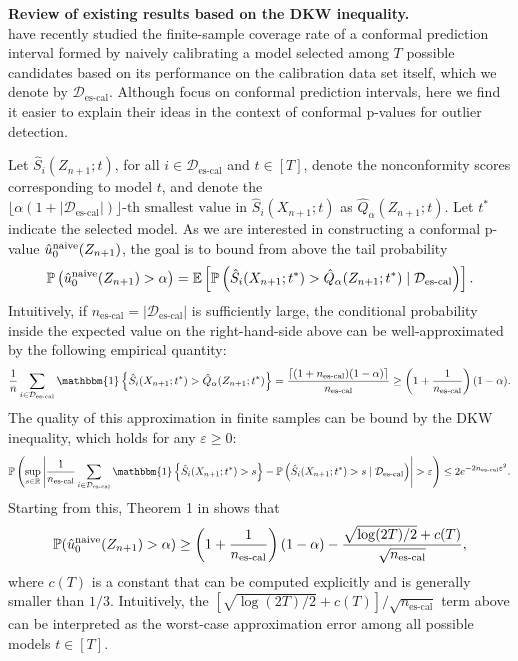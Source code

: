 \noindent \textbf{Review of existing results based on the DKW inequality.}\\
\citet{efficiency_first_cp} have recently studied the finite-sample coverage rate of a conformal prediction interval formed by naively calibrating a model selected among $T$ possible candidates based on its performance on the calibration data set itself, which we denote by $\mathcal{D}_{\text{es-cal}}$.
Although \citet{efficiency_first_cp} focus on conformal prediction intervals, here we find it easier to explain their ideas in the context of conformal p-values for outlier detection.

Let $\hat{S}_i(Z_{n+1};t)$, for all $i \in \mathcal{D}_{\text{es-cal}}$ and $t \in [T]$, denote the nonconformity scores corresponding to model $t$, and denote the  $\lfloor \alpha(1+|\mathcal{D}_{\text{es-cal}}|) \rfloor\text{-th smallest value in }\hat{S}_i(X_{n+1};t)$ as $\hat{Q}_{\alpha}(Z_{n+1};t)$.
Let $t^*$  indicate the selected model.
As we are interested in constructing a conformal p-value $\hat{u}_0^{\textup{naive}}(Z_{n+1})$, the goal is to bound from above the tail probability
\begin{align}
    \mathbb{P}\left( \hat{u}_0^{\textup{naive}}(Z_{n+1}) > \alpha \right) = \mathbb{E} \left[  \mathbb{P} \left( \hat{S}_i(X_{n+1};t^*)> \hat{Q}_{\alpha}(Z_{n+1};t^*) \mid \mathcal{D}_{\text{es-cal}}\right) \right].
\end{align}
Intuitively, if $n_{\text{es-cal}} = |\mathcal{D}_{\text{es-cal}}|$ is sufficiently large, the conditional probability inside the expected value on the right-hand-side above can be well-approximated by the following empirical quantity:
\begin{align*}
    \frac{1}{n}\sum_{i \in \mathcal{D}_{\text{es-cal}}} \mathbbm{1} \left\{ \hat{S}_i(X_{n+1};t^*) > \hat{Q}_{\alpha}(Z_{n+1};t^*) \right \} = \frac{\lceil (1+n_{\text{es-cal}})(1-\alpha) \rceil}{n_{\text{es-cal}}} \geq \left( 1+\frac{1}{n_{\text{es-cal}}}\right)(1-\alpha).
\end{align*}
The quality of this approximation in finite samples can be bound by the DKW inequality, which holds for any $\varepsilon \geq 0$:
\begin{align}
    \mathbb{P}\left( \sup_{s \in \mathbb{R}} \left| \frac{1}{n_{\text{es-cal}}}\sum_{i \in \mathcal{D}_{\text{es-cal}}} \mathbbm{1} \left\{\hat{S}_i(X_{n+1};t^*) > s \right \} -  \mathbb{P} \left( \hat{S}_i(X_{n+1};t^*)> s \mid \mathcal{D}_{\text{es-cal}}\right)\right| > \varepsilon \right) \leq 2 e^{-2 n_{\text{es-cal}} \varepsilon^2}.
\end{align}
Starting from this, Theorem 1 in \citet{efficiency_first_cp} shows that
\begin{align}
     \mathbb{P}(\hat{u}_0^{\textup{naive}}(Z_{n+1}) > \alpha) \geq \left(1+\frac{1}{n_{\text{es-cal}}} \right)(1-\alpha)-\frac{\sqrt{\log(2T)/2}+c(T)}{\sqrt{n_{\text{es-cal}}}},
\end{align}
where $c(T)$ is a constant that can be computed explicitly and is generally smaller than $1/3$.
Intuitively, the $[\sqrt{\log(2T)/2}+c(T)]/ \sqrt{n_{\text{es-cal}}}$ term above can be interpreted as the worst-case approximation error among all possible models $t \in [T]$.

